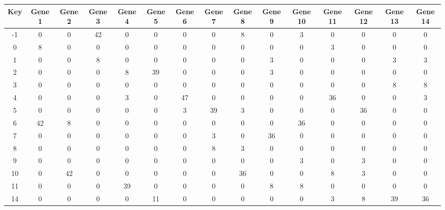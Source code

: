 \begin{tabular}{|c|c|c|c|c|c|c|c|c|c|c|c|c|c|c|}
\hline
Key & Gene 1 & Gene 2 & Gene 3 & Gene 4 & Gene 5 & Gene 6 & Gene 7 & Gene 8 & Gene 9 & Gene 10 & Gene 11 & Gene 12 & Gene 13 & Gene 14 \\
\hline
-1 & 0 & 0 & 42 & 0 & 0 & 0 & 0 & 8 & 0 & 3 & 0 & 0 & 0 & 0 \\
0 & 8 & 0 & 0 & 0 & 0 & 0 & 0 & 0 & 0 & 0 & 3 & 0 & 0 & 0 \\
1 & 0 & 0 & 8 & 0 & 0 & 0 & 0 & 0 & 3 & 0 & 0 & 0 & 3 & 3 \\
2 & 0 & 0 & 0 & 8 & 39 & 0 & 0 & 0 & 3 & 0 & 0 & 0 & 0 & 0 \\
3 & 0 & 0 & 0 & 0 & 0 & 0 & 0 & 0 & 0 & 0 & 0 & 0 & 8 & 8 \\
4 & 0 & 0 & 0 & 3 & 0 & 47 & 0 & 0 & 0 & 0 & 36 & 0 & 0 & 3 \\
5 & 0 & 0 & 0 & 0 & 0 & 3 & 39 & 3 & 0 & 0 & 0 & 36 & 0 & 0 \\
6 & 42 & 8 & 0 & 0 & 0 & 0 & 0 & 0 & 0 & 36 & 0 & 0 & 0 & 0 \\
7 & 0 & 0 & 0 & 0 & 0 & 0 & 3 & 0 & 36 & 0 & 0 & 0 & 0 & 0 \\
8 & 0 & 0 & 0 & 0 & 0 & 0 & 8 & 3 & 0 & 0 & 0 & 0 & 0 & 0 \\
9 & 0 & 0 & 0 & 0 & 0 & 0 & 0 & 0 & 0 & 3 & 0 & 3 & 0 & 0 \\
10 & 0 & 42 & 0 & 0 & 0 & 0 & 0 & 36 & 0 & 0 & 8 & 3 & 0 & 0 \\
11 & 0 & 0 & 0 & 39 & 0 & 0 & 0 & 0 & 8 & 8 & 0 & 0 & 0 & 0 \\
14 & 0 & 0 & 0 & 0 & 11 & 0 & 0 & 0 & 0 & 0 & 3 & 8 & 39 & 36 \\
\hline
\end{tabular}